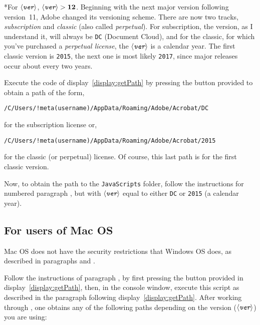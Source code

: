 \documentclass{article}
\makeatletter
\renewcommand{\paragraph}
    {\@startsection{paragraph}{4}{0pt}{6pt}{-3pt}
    {\normalfont\normalsize\bfseries}}
\def\app#1{\textsf{#1}}
\def\amtIndent{\parindent}
\def\meta#1{$\langle\textit{\texttt{#1}}\rangle$}
\makeatother
\begin{document}
\paragraph*{{\Stepiii}For $\mathbf{\text{\meta{ver}}}$, $\mathbf{
\text{\meta{ver}} > 12} $.} Beginning with the next major version following
version~11, Adobe changed its versioning scheme. There are now two tracks,
\emph{subscription} and \emph{classic} (also called \emph{perpetual}). For
subscription, the version, as I understand it, will always be \texttt{DC}
(Document Cloud), and for the classic, for which you've purchased a
\emph{perpetual license}, the \meta{ver} is a calendar year. The first
classic version is \texttt{2015}, the next one is most likely \texttt{2017},
since major releases occur about every two years.

Execute the code of display~\eqref{display:getPath} by pressing the button
provided to obtain a path of the form,
\begin{Verbatim}[xleftmargin=\amtIndent,fontsize=\small,commandchars=!()]
/C/Users/!meta(username)/AppData/Roaming/Adobe/Acrobat/DC
\end{Verbatim}
for the subscription license or,
\begin{Verbatim}[xleftmargin=\amtIndent,fontsize=\small,commandchars=!()]
/C/Users/!meta(username)/AppData/Roaming/Adobe/Acrobat/2015
\end{Verbatim}
for the classic (or perpetual) license. Of course, this last path is for
the first classic version.

Now, to obtain the path to the \texttt{JavaScripts} folder, follow the
instructions for numbered paragraph , but with \meta{ver} equal
to either \texttt{DC} or \texttt{2015} (a calendar year).


\subsection{For users of \app{Mac OS}}

\app{Mac OS} does not have the security restrictions that \app{Windows OS}
does, as described in paragraphs  and .

Follow the instructions of paragraph , by first pressing the button
provided in display~\eqref{display:getPath}, then, in the console window,
execute this script as described in the paragraph following
display~\eqref{display:getPath}. After working through , one
obtains any of the following paths depending on the version (\meta{ver}) you
are using:\medskip
\end{document}
